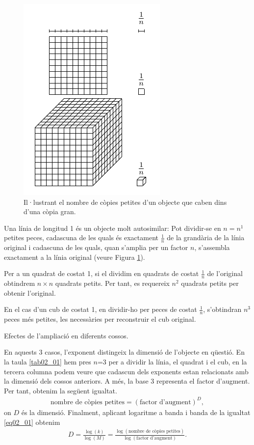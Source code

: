 \documentclass[12pt,a4paper]{report}
\begin{document}
\begin{figure}[!ht]
\centering
\includegraphics[scale=1.5]{img/img02_dim_auto.pdf}
\caption{Il·lustrant el nombre de còpies petites d'un objecte que caben dins d'una còpia gran.}
\label{img02_01}
\end{figure}
Una línia de longitud 1 és un objecte molt autosimilar: Pot dividir-se en $n = n^1$ petites peces, cadascuna de les quals és exactament $\displaystyle\frac{1}{n}$ de la grandària de la línia original i cadascuna de les quals, quan s'amplia per un factor $n$, s'assembla exactament a la línia original (veure Figura \ref{img02_01}).

Per a un quadrat de costat 1, si el dividim en quadrats de costat $\displaystyle\frac{1}{n}$ de l'original obtindrem $n\times n$ quadrats petits. Per tant, es requereix $n^2$ quadrats petits per obtenir l'original.

En el cas d'un cub de costat 1, en dividir-ho per peces de costat $\displaystyle\frac{1}{n}$, s'obtindran $n^3$ peces més petites, les necessàries per reconstruir el cub original.

\begin{table}[!ht]
\centering
{}
\caption{Efectes de l'ampliació en diferents cossos.}
\label{tab02_01}
\end{table}
En aquests 3 casos, l'exponent distingeix la dimensió de l'objecte en qüestió. En la taula \ref{tab02_01} hem pres $n$=3 per a dividir la línia, el quadrat i el cub, en la tercera columna podem veure que cadascun dels exponents estan relacionats amb la dimensió dels cossos anteriors. A més, la base 3 representa el factor d'augment. Per tant, obtenim la següent igualtat.
\begin{align}
\text{nombre de còpies petites} = (\text {factor d'augment})^{D},
\label{eq02_01}
\end{align}
on $D$ és la dimensió. Finalment, aplicant logaritme a banda i banda de la igualtat \ref{eq02_01} obtenim
\begin{align}
D = \frac{\log(k)}{\log(M)} = \frac{\log(\text{nombre de còpies petites})}{\log(\text{factor d'augment})}.
\label{eq02_02}
\end{align}
\end{document}
